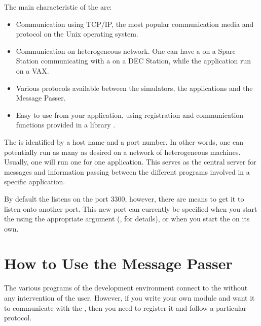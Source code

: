The main characteristic of the \MPA{} are:

\begin{itemize}

\item Communication using TCP/IP, the most popular communication media
and protocol on the  Unix operating system.

\item Communication on heterogeneous network. One can have a \XPK{}
on a Sparc Station communicating with a \CPK{} on a DEC Station,
while the application run on a VAX.

\item Various protocols available between the simulators, the
applications and the Message Passer.

\item Easy to use from your application, using registration and
communication functions provided in a library .

\end{itemize}

The \MPA{} is identified by a host name and a port number. In other words,
one can potentially run as many \MPA{} as desired on a network of
heterogeneous machines. Usually, one will run one \MPA{} for one \COPRS{}
application. This \MPA{} serves as the central server for messages and
information passing between the different programs involved in a
specific application.

By default the \MPA{} listens on the port 3300, however, there are means to get
it to listen onto another port. This new port can currently be specified when
you start the \OPRSS{} using the appropriate argument (, for details), or when you start the \MPA{} on its own.

\chapter{How to Use the Message Passer}

The various programs of the \COPRS{} development environment connect to the
\MPA{} without any intervention of the user. However, if you write your own
module and want it to communicate with the \MPA{}, then you need to
register it and follow a particular protocol.

